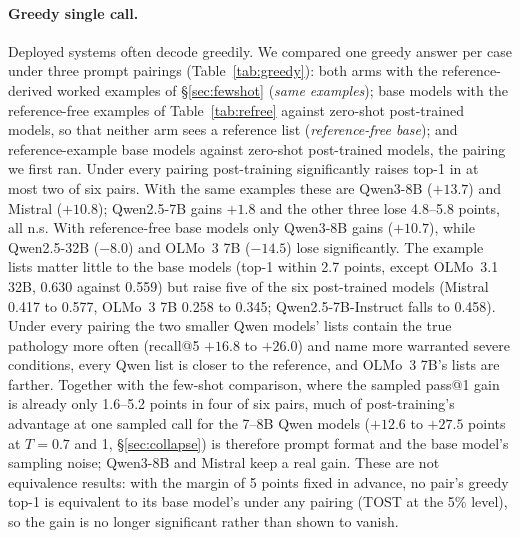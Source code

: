 \documentclass[11pt]{article}
\begin{document}
\paragraph{Greedy single call.} Deployed systems often decode greedily. We compared one greedy answer per case under three prompt pairings (Table~\ref{tab:greedy}): both arms with the reference-derived worked examples of \S\ref{sec:fewshot} (\emph{same examples}); base models with the reference-free examples of Table~\ref{tab:refree} against zero-shot post-trained models, so that neither arm sees a reference list (\emph{reference-free base}); and reference-example base models against zero-shot post-trained models, the pairing we first ran. Under every pairing post-training significantly raises top-1 in at most two of six pairs. With the same examples these are Qwen3-8B ($+13.7$) and Mistral ($+10.8$); Qwen2.5-7B gains $+1.8$ and the other three lose 4.8--5.8 points, all n.s. With reference-free base models only Qwen3-8B gains ($+10.7$), while Qwen2.5-32B ($-8.0$) and OLMo~3 7B ($-14.5$) lose significantly. The example lists matter little to the base models (top-1 within 2.7 points, except OLMo~3.1 32B, 0.630 against 0.559) but raise five of the six post-trained models (Mistral 0.417 to 0.577, OLMo~3 7B 0.258 to 0.345; Qwen2.5-7B-Instruct falls to 0.458). Under every pairing the two smaller Qwen models' lists contain the true pathology more often (recall@5 $+16.8$ to $+26.0$) and name more warranted severe conditions, every Qwen list is closer to the reference, and OLMo~3 7B's lists are farther. Together with the few-shot comparison, where the sampled pass@1 gain is already only 1.6--5.2 points in four of six pairs, much of post-training's advantage at one sampled call for the 7--8B Qwen models ($+12.6$ to $+27.5$ points at $T{=}0.7$ and 1, \S\ref{sec:collapse}) is therefore prompt format and the base model's sampling noise; Qwen3-8B and Mistral keep a real gain. These are not equivalence results: with the margin of 5 points fixed in advance, no pair's greedy top-1 is equivalent to its base model's under any pairing (TOST at the 5\% level), so the gain is no longer significant rather than shown to vanish.
\end{document}
